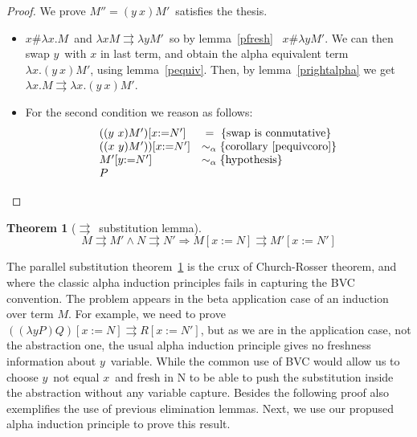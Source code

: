 \documentclass[preprint,10pt]{sigplanconf}
\newcommand{\lam}{\ensuremath{\lambda}}
\newcommand{\alpsym}{\ensuremath{\sim_\alpha}}
\newcommand{\p}{\ensuremath{\rightrightarrows}}
\newtheorem{theo}{Theorem}
\begin{document}
\begin{proof}
  We prove $M'' = (y\ x) M'$\ satisfies the thesis. 
  \begin{itemize}
  \item $x \# \lam x . M$\ and $\lam x M \p \lam y M'$\ so by lemma~\ref{pfresh} \ $x \# \lam y M'$.
We can then swap $y$\ with $x$ in last term, and obtain the alpha equivalent term $\lam x . (y\ x) M'$, using lemma~\ref{pequiv}. Then, by lemma~\ref{prightalpha} we get $\lam x . M \p \lam x. (y\ x)M'$.

  \item For the second condition we reason as follows:
    \[
    \begin{array}{ll}
     ((y\ x) M') [ x{:=}N'] & \ = \ \text{\{swap is conmutative\}} \\
     ((x\ y) M'))[ x {:=} N'] & \alpsym {\text{\{corollary~\ref{pequivcoro}\}}}\\
     M' [y {:=} N']  & \alpsym {\text{\{hypothesis\}}} \\
	P &
    \end{array}
    \]
  \end{itemize}
\end{proof}

\begin{theo}[\p\ substitution lemma]
\label{psubst}
\[ M \p M' \wedge N \p N'  \Rightarrow M [ x {:=} N ] \p M' [ x {:=} N' ] \]
\end{theo}

The parallel substitution theorem~\ref{psubst} is the crux of Church-Rosser theorem, and where the classic alpha induction principles fails in capturing the BVC convention. The problem appears in the beta application case of an induction over term $M$. For example, we need to prove $((\lam y P) Q) [x {:=} N ] \p R [x {:=} N']$, but as we are in the application case, not the abstraction one, the usual alpha induction principle gives no freshness information about $y$\ variable. While the common use of BVC would allow us to choose $y$\ not equal $x$\ and fresh in N to be able to push the substitution inside the abstraction without any variable capture. Besides the following proof also exemplifies the use of previous elimination lemmas. Next, we use our propused alpha induction principle to prove this result.
\end{document}
